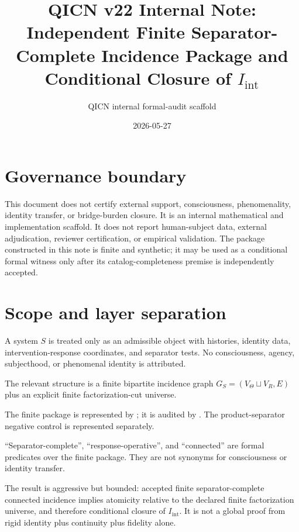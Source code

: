 \documentclass[11pt]{article}
\title{QICN v22 Internal Note: Independent Finite Separator-Complete Incidence Package and Conditional Closure of \texorpdfstring{$I_{\mathrm{int}}$}{I_int}}
\author{QICN internal formal-audit scaffold}
\date{2026-05-27}
\newcommand{\Iint}{I_{\mathrm{int}}}
\newcommand{\VTheta}{V_{\Theta}}
\newcommand{\VR}{V_R}
\begin{document}
\maketitle

\section*{Governance boundary}
This document does not certify external support, consciousness, phenomenality, identity transfer, or bridge-burden closure. It is an internal mathematical and implementation scaffold. It does not report human-subject data, external adjudication, reviewer certification, or empirical validation. The package constructed in this note is finite and synthetic; it may be used as a conditional formal witness only after its catalog-completeness premise is independently accepted.

\section{Scope and layer separation}

\begin{description}[leftmargin=2.9cm]
  \item[Ontology.] A system $S$ is treated only as an admissible object with histories, identity data, intervention-response coordinates, and separator tests. No consciousness, agency, subjecthood, or phenomenal identity is attributed.
  \item[Mathematical model.] The relevant structure is a finite bipartite incidence graph $G_S=(\VTheta\sqcup\VR,E)$ plus an explicit finite factorization-cut universe.
  \item[Implementation.] The finite package is represented by ; it is audited by . The product-separator negative control is represented separately.
  \item[Language.] ``Separator-complete'', ``response-operative'', and ``connected'' are formal predicates over the finite package. They are not synonyms for consciousness or identity transfer.
  \item[Interpretation.] The result is aggressive but bounded: accepted finite separator-complete connected incidence implies atomicity relative to the declared finite factorization universe, and therefore conditional closure of $\Iint$. It is not a global proof from rigid identity plus continuity plus fidelity alone.
\end{description}
\end{document}
